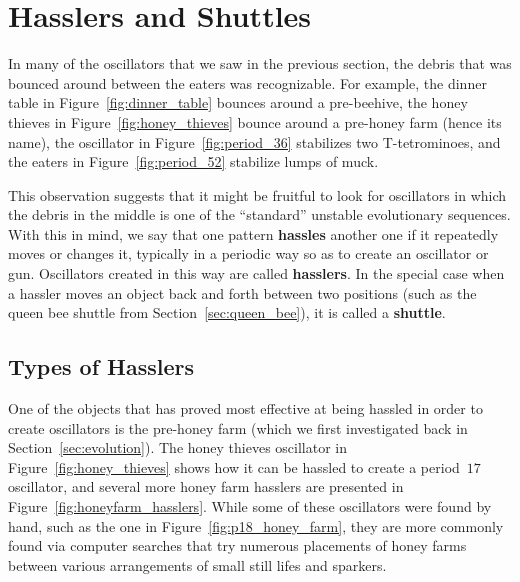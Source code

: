 \section{Hasslers and Shuttles}\label{sec:hasslers}

In many of the oscillators that we saw in the previous section, the debris that was bounced around between the eaters was recognizable. For example, the dinner table in Figure~\ref{fig:dinner_table} bounces around a pre-beehive, the honey thieves in Figure~\ref{fig:honey_thieves} bounce around a pre-honey farm (hence its name), the oscillator in Figure~\ref{fig:period_36} stabilizes two T-tetrominoes, and the eaters in Figure~\ref{fig:period_52} stabilize lumps of muck.

This observation suggests that it might be fruitful to look for oscillators in which the debris in the middle is one of the ``standard'' unstable evolutionary sequences. With this in mind, we say that one pattern \textbf{hassles} another one if it repeatedly moves or changes it, typically in a periodic way so as to create an oscillator or gun. Oscillators created in this way are called \textbf{hasslers}. In the special case when a hassler moves an object back and forth between two positions (such as the queen bee shuttle from Section~\ref{sec:queen_bee}), it is called a \textbf{shuttle}.



\subsection{Types of Hasslers}\label{sec:hassler_types}

One of the objects that has proved most effective at being hassled in order to create oscillators is the pre-honey farm (which we first investigated back in Section~\ref{sec:evolution}). The honey thieves oscillator in Figure~\ref{fig:honey_thieves} shows how it can be hassled to create a period~$17$ oscillator, and several more honey farm hasslers are presented in Figure~\ref{fig:honeyfarm_hasslers}. While some of these oscillators were found by hand, such as the one in Figure~\ref{fig:p18_honey_farm}, they are more commonly found via computer searches that try numerous placements of honey farms between various arrangements of small still lifes and sparkers.

